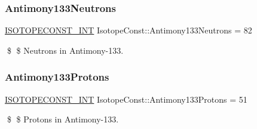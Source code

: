 \subsubsection{\texorpdfstring{Antimony133\+Neutrons}{Antimony133Neutrons}}
{\footnotesize\ttfamily \mbox{\hyperlink{group___isotope_const-_macros_ga5f18360b3e99483a35c32d789e62621c}{I\+S\+O\+T\+O\+P\+E\+C\+O\+N\+S\+T\+\_\+\+I\+NT}} Isotope\+Const\+::\+Antimony133\+Neutrons = 82}

\$ \$ Neutrons in Antimony-\/133. \mbox{\label{group___isotope_const-_antimony-_sb133_gaac8d7d118ec5729eac03574302508134}} 
\subsubsection{\texorpdfstring{Antimony133\+Protons}{Antimony133Protons}}
{\footnotesize\ttfamily \mbox{\hyperlink{group___isotope_const-_macros_ga5f18360b3e99483a35c32d789e62621c}{I\+S\+O\+T\+O\+P\+E\+C\+O\+N\+S\+T\+\_\+\+I\+NT}} Isotope\+Const\+::\+Antimony133\+Protons = 51}

\$ \$ Protons in Antimony-\/133. 